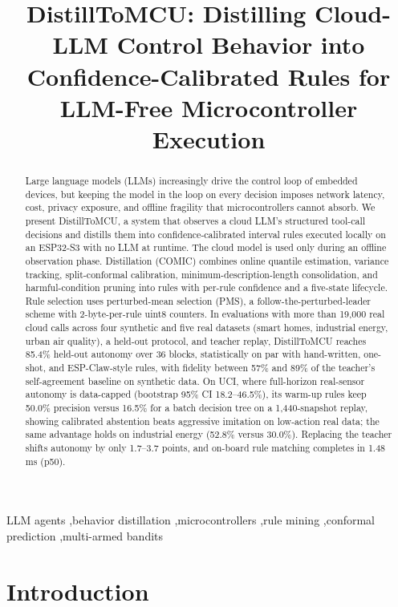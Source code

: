 \documentclass[review]{elsarticle}
\title{DistillToMCU: Distilling Cloud-LLM Control Behavior into
Confidence-Calibrated Rules for LLM-Free Microcontroller Execution}
\begin{document}
\begin{frontmatter}

\begin{abstract}
Large language models (LLMs) increasingly drive the control loop of embedded
devices, but keeping the model in the loop on every decision imposes network
latency, cost, privacy exposure, and offline fragility that microcontrollers
cannot absorb. We present DistillToMCU, a system that observes a cloud LLM's
structured tool-call decisions and distills them into confidence-calibrated
interval rules executed locally on an ESP32-S3 with no LLM at runtime.
The cloud model is used only during an offline observation phase.
Distillation (COMIC) combines online quantile estimation, variance tracking,
split-conformal calibration, minimum-description-length consolidation, and
harmful-condition pruning into rules with per-rule confidence and a five-state
lifecycle. Rule selection uses perturbed-mean selection (PMS), a
follow-the-perturbed-leader scheme with 2-byte-per-rule uint8 counters. In
evaluations with more than 19,000 real cloud calls across four synthetic and
five real datasets (smart homes, industrial energy, urban air quality), a
held-out protocol, and teacher replay, DistillToMCU reaches 85.4\% held-out
autonomy over 36 blocks, statistically on par with hand-written, one-shot, and
ESP-Claw-style rules, with fidelity between 57\% and 89\% of the teacher's
self-agreement baseline on synthetic data. On UCI, where full-horizon
real-sensor autonomy is data-capped (bootstrap 95\% CI 18.2--46.5\%), its
warm-up rules keep 50.0\% precision versus 16.5\% for a batch decision tree on
a 1,440-snapshot replay, showing calibrated abstention beats aggressive
imitation on low-action real data; the same advantage holds on industrial
energy (52.8\% versus 30.0\%). Replacing the teacher shifts autonomy by only
1.7--3.7 points, and on-board rule matching completes in 1.48 ms (p50).
\end{abstract}

\begin{keyword}
LLM agents \sep behavior distillation \sep microcontrollers \sep rule mining
\sep conformal prediction \sep multi-armed bandits
\end{keyword}

\end{frontmatter}

\section{Introduction}
\end{document}
